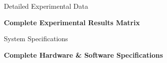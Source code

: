 \documentclass[aspectratio=169]{beamer}
\begin{document}
\appendix

\begin{frame}{Detailed Experimental Data}
\begin{center}
\textbf{Complete Experimental Results Matrix}
\end{center}
\end{frame}

\begin{frame}{System Specifications}
\begin{center}
\textbf{Complete Hardware \& Software Specifications}
\end{center}
\end{frame}
\end{document}
